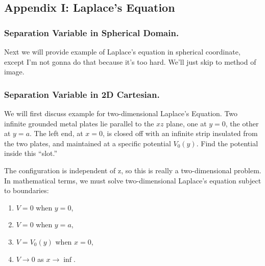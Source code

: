 \documentclass[../../../main.tex]{subfiles}
\begin{document}
\subsection{Appendix I: Laplace's Equation}

\subsubsection{Separation Variable in Spherical Domain.} Next we will provide example of Laplace's equation in spherical coordinate, except I'm not gonna do that because it's too hard. We'll just skip to method of image.

\subsubsection{Separation Variable in 2D Cartesian.} We will first discuss example for two-dimensional Laplace's Equation. Two infinite grounded metal plates lie parallel to the $x z$ plane, one at $y = 0$, the other at $y = a$. The left end, at $x = 0$, is closed off with an infinite strip insulated from the two plates, and maintained at a specific potential $V_0(y)$. Find the potential inside this “slot.”
\begin{figure}[ht]
    \centering
\end{figure}
The configuration is independent of z, so this is really a two-dimensional problem.
In mathematical terms, we must solve two-dimensional Laplace's equation subject to boundaries:
\begin{enumerate}
    \item $V = 0$ when $y = 0$,
    \item $V = 0$ when $y = a$,
    \item $V = V_0(y)$ when $x = 0$,
    \item $V \rightarrow 0$ as $x\rightarrow\inf $.
\end{enumerate}
\end{document}
